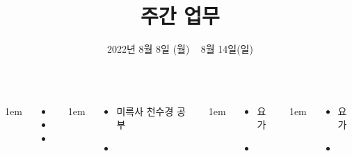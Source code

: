 \documentclass[	20pt, 
							a1paper, 
							portrait, %
							margin=0mm, %
							innermargin=10mm,  		%
							colspace=5mm, 
							subcolspace=0mm
							]{tikzposter}
\title{주간 업무}
\author{ 2022년 8월 8일 (월) ~ 8월 14일(일) }
\begin{document}
	\maketitle

	\begin{columns}


			{
					\setlength{\leftmargini}{7em}
					\setlength{\labelsep} {1em}
				\begin{LARGE}
					\begin{itemize}
					\item 
					\item 
					\item 
					\end{itemize}
				\end{LARGE}
			}

			{
					\setlength{\leftmargini}{7em}
					\setlength{\labelsep} {1em}
				\begin{LARGE}
					\begin{itemize}
					\item 미륵사 천수경 공부
					\item 

					\end{itemize}
				\end{LARGE}
			}


			{
					\setlength{\leftmargini}{4em}
					\setlength{\labelsep} {1em}
				\begin{LARGE}
					\begin{itemize}
					\item 요가
					\item 
					\end{itemize}
				\end{LARGE}
			}



			{
					\setlength{\leftmargini}{4em}
					\setlength{\labelsep} {1em}
				\begin{LARGE}
					\begin{itemize}
					\item 요가
					\item 
					\end{itemize}
				\end{LARGE}
			}


\end{columns}
\end{document}

